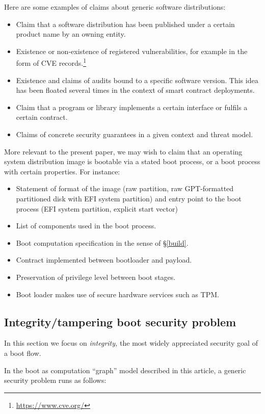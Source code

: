Here are some examples of claims about generic software distributions:
\begin{itemize}
  \item Claim that a software distribution has been published under a certain product name by an owning entity.
  \item Existence or non-existence of registered vulnerabilities, for example in the form of CVE records.\footnote{\url{https://www.cve.org/}}
  \item Existence and claims of audits bound to a specific software version. This idea has been floated several times in the context of smart contract deployments.
  \item Claim that a program or library implements a certain interface or fulfils a certain contract.
  \item Claims of concrete security guarantees in a given context and threat model.
\end{itemize}
%
More relevant to the present paper, we may wish to claim that an operating system distribution image is bootable via a stated boot process, or a boot process with certain properties.
%
For instance:
\begin{itemize}
  \item Statement of format of the image (raw partition, raw GPT-formatted partitioned disk with EFI system partition) and entry point to the boot process (EFI system partition, explicit start vector)
  \item List of components used in the boot process.
  \item Boot computation specification in the sense of \S\ref{build}.
  \item Contract implemented between bootloader and payload.
  \item Preservation of privilege level between boot stages.
  \item Boot loader makes use of secure hardware services such as TPM.
\end{itemize}


\subsection{Integrity/tampering boot security problem}

In this section we focus on \emph{integrity,} the most widely
appreciated security goal of a boot flow.

In the boot as computation ``graph'' model described in this article, a
generic security problem runs as follows:

